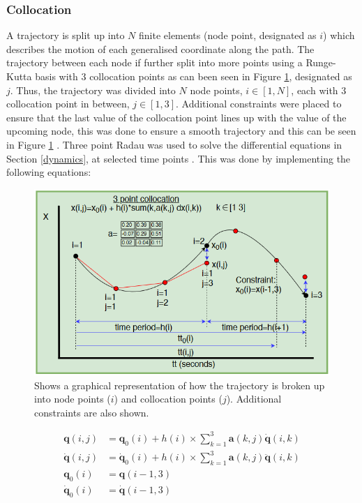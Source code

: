         \subsubsection{Collocation}
        A trajectory is split up into $N$ finite elements (node point, designated as $i$) which describes the motion of each generalised coordinate along the path. The trajectory between each node if further split into more points using a Runge-Kutta basis with 3 collocation points as can been seen in Figure \ref{fig:collocation}, designated as $j$. Thus, the trajectory was divided into $N$ node points, $i\in[1,N]$, each with 3 collocation point in between, $j\in[1,3]$. Additional constraints were placed to ensure that the last value of the collocation point lines up with the value of the upcoming node, this was done to ensure a smooth trajectory and this can be seen in Figure \ref{fig:collocation} \cite{Fisher-2020}. Three point Radau was used to solve the differential equations in Section \ref{dynamics}, at selected time points \cite{Fisher-2020}. This was done by implementing the following equations:
        
        \begin{figure}[ht!]
            \centering
            \includegraphics[width=\textwidth]{figs/collocation}
            \caption{Shows a graphical representation of how the trajectory is broken up into node points ($i$) and collocation points ($j$). Additional constraints are also shown.}
            \label{fig:collocation}
        \end{figure}
        
        \begin{equation} \label{eq:collocation}
            \begin{split}
                \bm{q}(i,j) & = \bm{q}_0(i) + h(i) \times \sum_{k=1}^{3} \bm{a}(k,j)\dot{\bm{q}}(i,k) \\
                \dot{\bm{q}}(i,j) & = \dot{\bm{q}}_0(i) + h(i) \times \sum_{k=1}^{3} \bm{a}(k,j)\ddot{\bm{q}}(i,k) \\
                \bm{q}_0(i) & = \bm{q}(i - 1,3) \\
                \dot{\bm{q}}_0(i) & = \dot{\bm{q}}(i - 1,3)
            \end{split}
        \end{equation}
        
